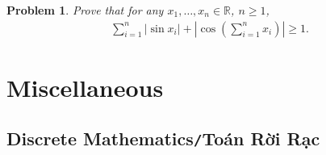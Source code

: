 \documentclass[oneside]{book}
\numberwithin{equation}{section}
\newtheorem{problem}{Problem}[section]
\begin{document}
\begin{problem}
	Prove that for any $x_1,\ldots,x_n\in\mathbb{R}$, $n\ge 1$,
	\begin{align*}
		\sum_{i=1}^n |\sin x_i| + \left|\cos\left(\sum_{i=1}^n x_i\right)\right|\ge 1.
	\end{align*}
\end{problem}


\chapter{Miscellaneous}

\section{Discrete Mathematics\texttt{/}Toán Rời Rạc}
\end{document}
